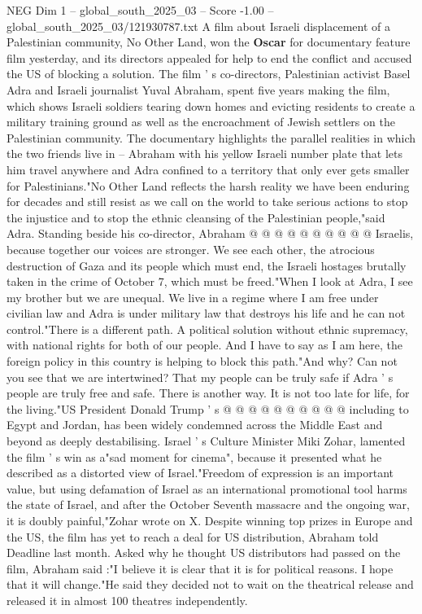 \begin{textsample}{NEG Dim 1 – global\_south\_2025\_03 – Score -1.00 – global\_south\_2025\_03/121930787.txt}  \label{ex:f1_neg_159}
A film about Israeli displacement of a Palestinian community, No Other Land, won the \textbf{Oscar} for documentary feature film yesterday, and its directors appealed for help to end the conflict and accused the US of blocking a solution.
The film ' s co-directors, Palestinian activist Basel Adra and Israeli journalist Yuval Abraham, spent five years making the film, which shows Israeli soldiers tearing down homes and evicting residents to create a military training ground as well as the encroachment of Jewish settlers on the Palestinian community.
The documentary highlights the parallel realities in which the two friends live in -- Abraham with his yellow Israeli number plate that lets him travel anywhere and Adra confined to a territory that only ever gets smaller for Palestinians."No Other Land reflects the harsh reality we have been enduring for decades and still resist as we call on the world to take serious actions to stop the injustice and to stop the ethnic cleansing of the Palestinian people,"said Adra.
Standing beside his co-director, Abraham @ @ @ @ @ @ @ @ @ @ Israelis, because together our voices are stronger.
We see each other, the atrocious destruction of Gaza and its people which must end, the Israeli hostages brutally taken in the crime of October 7, which must be freed."When I look at Adra, I see my brother but we are unequal.
We live in a regime where I am free under civilian law and Adra is under military law that destroys his life and he can not control."There is a different path.
A political solution without ethnic supremacy, with national rights for both of our people.
And I have to say as I am here, the foreign policy in this country is helping to block this path."And why?
Can not you see that we are intertwined?
That my people can be truly safe if Adra ' s people are truly free and safe.
There is another way.
It is not too late for life, for the living."US President Donald Trump ' s @ @ @ @ @ @ @ @ @ @ including to Egypt and Jordan, has been widely condemned across the Middle East and beyond as deeply destabilising.
Israel ' s Culture Minister Miki Zohar, lamented the film ' s win as a"sad moment for cinema", because it presented what he described as a distorted view of Israel."Freedom of expression is an important value, but using defamation of Israel as an international promotional tool harms the state of Israel, and after the October Seventh massacre and the ongoing war, it is doubly painful,"Zohar wrote on X.
Despite winning top prizes in Europe and the US, the film has yet to reach a deal for US distribution, Abraham told Deadline last month.
Asked why he thought US distributors had passed on the film, Abraham said :"I believe it is clear that it is for political reasons.
I hope that it will change."He said they decided not to wait on the theatrical release and released it in almost 100 theatres independently.

\end{textsample}

